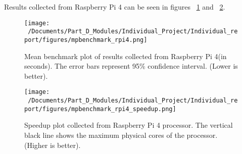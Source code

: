Results collected from Raspberry Pi 4 can be seen in figures ~\ref{fig:mpbenchmark_rpi4_plot} and ~\ref{fig:mpbenchmark_rpi4_speedup_plot}. 

\begin{figure}[H] %
	\centering
	\texttt{[image: ~/Documents/Part\_D\_Modules/Individual\_Project/Individual\_report/figures/mpbenchmark\_rpi4.png]} %
	\caption{Mean benchmark plot of results collected from Raspberry Pi 4(in seconds). The error bars represent 95\% confidence interval. (Lower is better).}
	\label{fig:mpbenchmark_rpi4_plot} %
\end{figure}

\begin{figure}[H] %
	\centering
	\texttt{[image: ~/Documents/Part\_D\_Modules/Individual\_Project/Individual\_report/figures/mpbenchmark\_rpi4\_speedup.png]} %
	\caption{Speedup plot collected from Raspberry Pi 4 processor. The vertical black line shows the maximum physical cores of the processor. (Higher is better).}
	\label{fig:mpbenchmark_rpi4_speedup_plot} %
\end{figure}

\begin{table}[h!]
	\centering
	\caption{Mean deadlines missed, results collected from the Raspberry Pi 5.}
	\label{tab:mpbenchmark_rpi5} %
\end{table}

